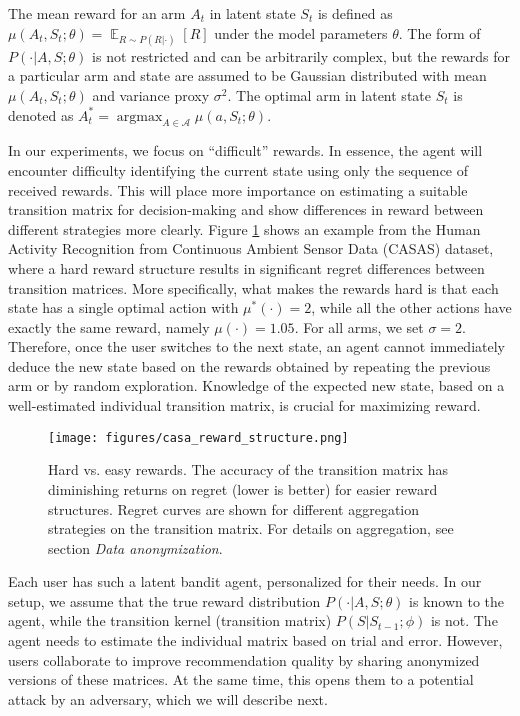 \documentclass{article}
\DeclareMathOperator{\EX}{\mathbb{E}}
\newcommand{\argmax}{\mathop{\mathrm{argmax}}}
\begin{document}
The mean reward for an arm $A_t$ in latent state $S_t$ is defined as $\mu{(A_t, S_t;\theta)} = \EX_{R\sim P(R | \cdot)}\left[R\right]$ under the model parameters $\theta$. The form of $P(\cdot | A, S; \theta)$ is not restricted and can be arbitrarily complex, but the rewards for a particular arm and state are assumed to be Gaussian distributed with mean $\mu{(A_t, S_t;\theta)}$ and variance proxy $\sigma^2$. The optimal arm in latent state $S_t$ is denoted as $A_t^* = \argmax_{A \in \mathcal{A}} \mu{(a, S_t;\theta)}$. 

In our experiments, we focus on ``difficult'' rewards. In essence, the agent will encounter difficulty identifying the current state using only the sequence of received rewards. This will place more importance on estimating a suitable transition matrix for decision-making and show differences in reward between different strategies more clearly. 
Figure \ref{fig:reward_structure} shows an example from the Human Activity Recognition from Continuous Ambient Sensor Data (CASAS) dataset, where a hard reward structure results in significant regret differences between transition matrices.  
More specifically, what makes the rewards hard is that each state has a single optimal action with $\mu^*(\cdot) = 2$, while all the other actions have exactly the same reward, namely $\mu(\cdot) = 1.05$. For all arms, we set $\sigma = 2$. Therefore, once the user switches to the next state, an agent cannot immediately deduce the new state based on the rewards obtained by repeating the previous arm or by random exploration. Knowledge of the expected new state, based on a well-estimated individual transition matrix, is crucial for maximizing reward.

\begin{figure}
     \centering
     \texttt{[image: figures/casa\_reward\_structure.png]}
     \caption{Hard vs. easy rewards. The accuracy of the transition matrix has diminishing returns on regret (lower is better) for easier reward structures. Regret curves are shown for different aggregation strategies on the transition matrix. For details on aggregation, see section \textit{Data anonymization}.}
     \label{fig:reward_structure}
\end{figure}

Each user has such a latent bandit agent, personalized for their needs. In our setup, we assume that the true reward distribution $P(\cdot | A, S; \theta)$ is known to the agent, while the transition kernel (transition matrix) $P(S|S_{t-1};\phi)$ is not. The agent needs to estimate the individual matrix based on trial and error. However, users collaborate to improve recommendation quality by sharing anonymized versions of these matrices.  At the same time, this opens them to a potential attack by an adversary, which we will describe next.
\end{document}
